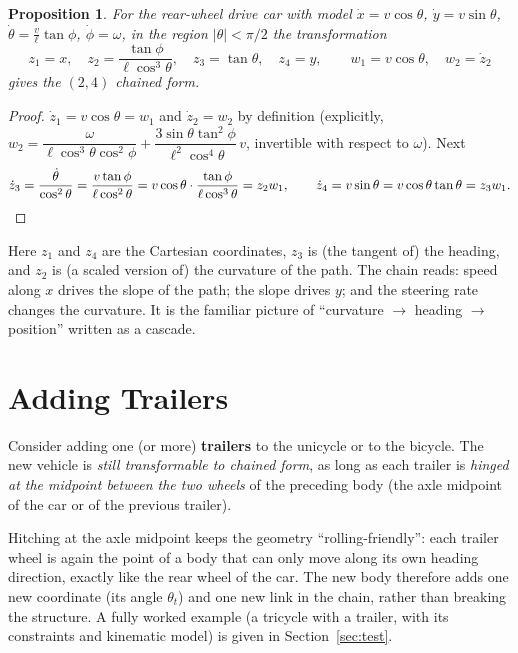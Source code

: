 \documentclass[11pt,a4paper]{article}
\theoremstyle{definition}
\theoremstyle{plain}
\newtheorem{proposition}[definition]{Proposition}
\theoremstyle{remark}
\begin{document}
\begin{proposition}\label{prop:bicycle}
For the rear-wheel drive car with model $\dot x=v\cos\theta$, $\dot y=v\sin\theta$, $\dot\theta=\tfrac{v}{\ell}\tan\phi$, $\dot\phi=\omega$, in the region $|\theta|<\pi/2$ the transformation
\[
 z_1=x,\quad z_2=\frac{\tan\phi}{\ell\cos^3\theta},\quad z_3=\tan\theta,\quad z_4=y,
 \qquad w_1=v\cos\theta,\quad w_2=\dot z_2
\]
gives the $(2,4)$ chained form.
\end{proposition}
\begin{proof}
$\dot z_1=v\cos\theta=w_1$ and $\dot z_2=w_2$ by definition (explicitly, $w_2=\dfrac{\omega}{\ell\cos^3\theta\cos^2\phi}+\dfrac{3\sin\theta\tan^2\phi}{\ell^2\cos^4\theta}\,v$, invertible with respect to $\omega$). Next
\[
 \dot z_3=\frac{\dot\theta}{\cos^2\theta}=\frac{v\tan\phi}{\ell\cos^2\theta}=v\cos\theta\cdot\frac{\tan\phi}{\ell\cos^3\theta}=z_2w_1,
\qquad
 \dot z_4=v\sin\theta=v\cos\theta\tan\theta=z_3w_1 .\qedhere
\]
\end{proof}

\begin{intuition}
Here $z_1$ and $z_4$ are the Cartesian coordinates, $z_3$ is (the tangent of) the heading, and $z_2$ is (a scaled version of) the curvature of the path. The chain reads: speed along $x$ drives the slope of the path; the slope drives $y$; and the steering rate changes the curvature. It is the familiar picture of ``curvature $\to$ heading $\to$ position'' written as a cascade.
\end{intuition}

\section{Adding Trailers}

Consider adding one (or more) \textbf{trailers} to the unicycle or to the bicycle. The new vehicle is \emph{still transformable to chained form}, as long as each trailer is \emph{hinged at the midpoint between the two wheels} of the preceding body (the axle midpoint of the car or of the previous trailer).

\begin{intuition}
Hitching at the axle midpoint keeps the geometry ``rolling-friendly'': each trailer wheel is again the point of a body that can only move along its own heading direction, exactly like the rear wheel of the car. The new body therefore adds one new coordinate (its angle $\theta_t$) and one new link in the chain, rather than breaking the structure. A fully worked example (a tricycle with a trailer, with its constraints and kinematic model) is given in Section~\ref{sec:test}.
\end{intuition}
\end{document}
